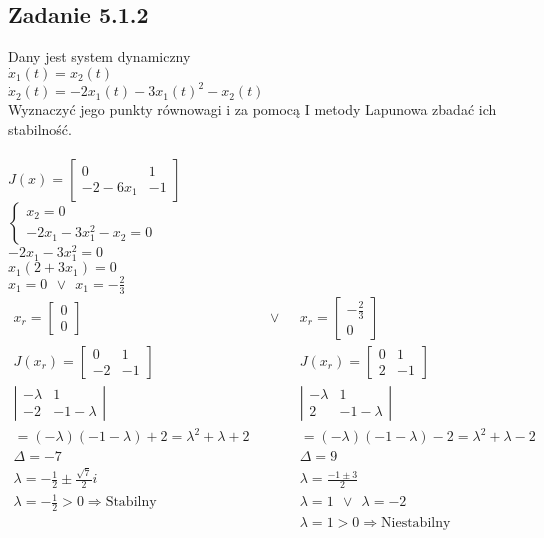 \subsection*{Zadanie 5.1.2} {\color{darkgray}
	Dany jest system dynamiczny\\
	$\dot{x}_1(t)=x_2(t)$\\
	$\dot{x}_2(t)=-2x_1(t)-3x_1(t)^2-x_2(t)$\\
	Wyznaczyć jego punkty równowagi i za pomocą I metody Lapunowa zbadać ich stabilność.
}\\\\
$J(x)=\left[ \begin{array}{cc}  0&1\\-2-6x_1 & -1   \end{array}\right]$\\
$\begin{cases}x_2=0\\-2x_1-3x_1^2-x_2=0\end{cases}$\\
$-2x_1-3x_1^2=0$\\
$x_1(2+3x_1)=0$\\
$x_1=0\ \  \vee \ \ x_1=-\frac23$\\
$\begin{array}{lll}
x_r= \left[ \begin{array}{c}   0\\0    \end{array}\right] &\ \ \ \vee \ \ \ & x_r= \left[ \begin{array}{c}   -\frac 23\\0    \end{array}\right] \\
J(x_r)=\left[ \begin{array}{cc}  0&1\\-2&-1    \end{array}\right] && J(x_r)=\left[ \begin{array}{cc}   0&1\\2&-1    \end{array}\right]\\
\left| \begin{array}{cc}  -\lambda & 1 \\-2&-1-\lambda    \end{array}\right|&&\left| \begin{array}{cc}  -\lambda & 1 \\2&-1-\lambda    \end{array}\right|\\
=(-\lambda)(-1-\lambda)+2=\lambda^2+\lambda+2&&=(-\lambda)(-1-\lambda)-2=\lambda^2+\lambda-2\\
\Delta=-7&&\Delta=9\\
\lambda=-\frac 12 \pm \frac{\sqrt 7}{2}i&&\lambda=\frac{-1 \pm 3}{2}\\
\lambda = -\frac 12 >0 \Rightarrow \text{Stabilny} && \lambda = 1 \ \ \vee \ \ \lambda=-2\\
 && \lambda = 1 >0 \Rightarrow \text{Niestabilny}
\end{array}$\\

